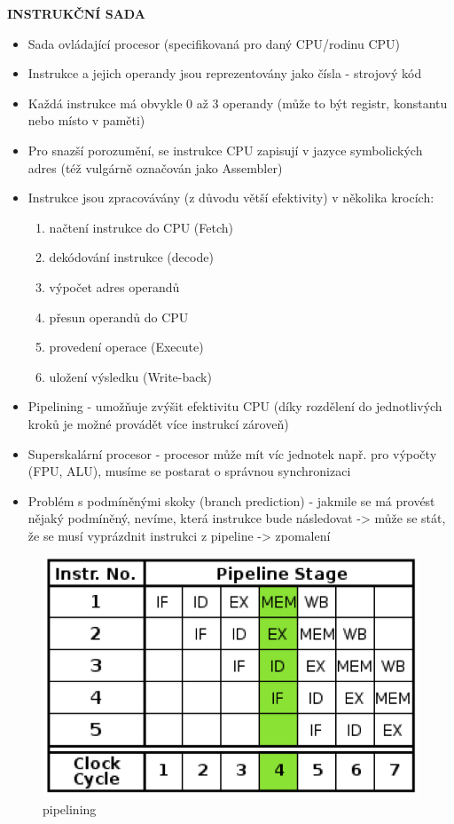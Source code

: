 \documentclass[10pt,a4paper]{article}
\begin{document}
\textbf{INSTRUKČNÍ SADA}
\begin{itemize}
	\item Sada ovládající procesor (specifikovaná pro daný CPU/rodinu CPU)
	\item Instrukce a jejich operandy jsou reprezentovány jako čísla - strojový kód
	\item Každá instrukce má obvykle 0 až 3 operandy (může to být registr, konstantu nebo místo v paměti)
	\item Pro snazší porozumění, se instrukce CPU zapisují v jazyce symbolických adres (též vulgárně označován jako Assembler)
	\item Instrukce jsou zpracovávány (z důvodu větší efektivity) v několika krocích:
	\begin{enumerate}
		\item načtení instrukce do CPU (Fetch)
		\item dekódování instrukce (decode)
		\item výpočet adres operandů
		\item přesun operandů do CPU
		\item provedení operace (Execute)
		\item uložení výsledku (Write-back)
	\end{enumerate}
	\item Pipelining - umožňuje zvýšit efektivitu CPU (díky rozdělení do jednotlivých kroků je možné provádět více instrukcí zároveň)
	\item Superskalární procesor - procesor může mít víc jednotek např. pro výpočty (FPU, ALU), musíme se postarat o správnou synchronizaci
	\item Problém s podmíněnými skoky (branch prediction) - jakmile se má provést nějaký podmíněný, nevíme, která instrukce bude následovat -> může se stát, že se musí vyprázdnit instrukci z pipeline -> zpomalení
\end{itemize}

\begin{figure} [h]
		\includegraphics[scale=0.7]{img/pipelining.png}
		\caption{pipelining}
\end{figure}
\end{document}
